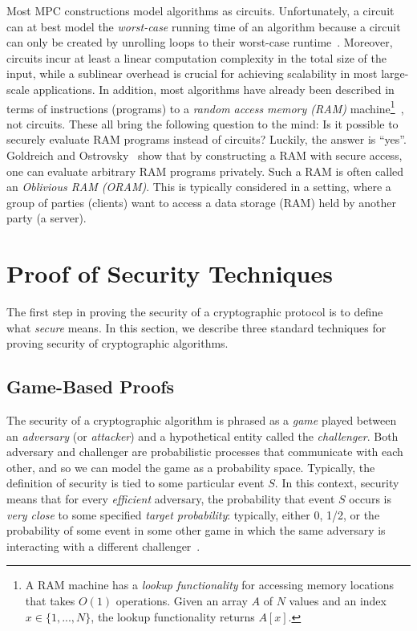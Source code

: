 \documentclass[11pt]{article}
\theoremstyle{plain}
\begin{document}
\label{sec:oram} Most MPC constructions model algorithms as circuits.
Unfortunately, a circuit can at best model the \emph{worst-case} running
time of an algorithm because a circuit can only be created by unrolling
loops to their worst-case runtime~\cite{Goldwasser:2013:Turing}.
Moreover, circuits incur at least a linear computation complexity
in the total size of the input, while a sublinear overhead is crucial
for achieving scalability in most large-scale applications. In addition,
most algorithms have already been described in terms of instructions
(programs) to a \emph{random access memory (RAM)} machine\footnote{A RAM machine has a \emph{lookup functionality} for accessing memory
	locations that takes $O(1)$ operations. Given an array $A$ of $N$
	values and an index $x\in\{1,...,N\}$, the lookup functionality returns
	$A[x]$.}~\cite{Cook:1972:TRA:800152.804898}, not circuits. These all bring
the following question to the mind: Is it possible to securely evaluate
RAM programs instead of circuits? Luckily, the answer is ``yes''.
Goldreich and Ostrovsky~\cite{Goldreich:1996:SPS:233551.233553}
show that by constructing a RAM with secure access, one can evaluate
arbitrary RAM programs privately. Such a RAM is often called an \emph{Oblivious
	RAM (ORAM)}. This is typically considered in a setting, where a group
of parties (clients) want to access a data storage (RAM) held by another
party (a server). 

\section{Proof of Security Techniques}

The first step in proving the security of a cryptographic protocol
is to define what \emph{secure} means. In this section, we describe
three standard techniques for proving security of cryptographic algorithms.

\subsection{Game-Based Proofs}

The security of a cryptographic algorithm is phrased as a \emph{game}
played between an \emph{adversary} (or \emph{attacker}) and a hypothetical
entity called the \emph{challenger}. Both adversary and challenger
are probabilistic processes that communicate with each other, and
so we can model the game as a probability space. Typically, the definition
of security is tied to some particular event $S$. In this context,
security means that for every \emph{efficient} adversary, the probability
that event $S$ occurs is \emph{very close} to some specified \emph{target
	probability}: typically, either 0, 1/2, or the probability of some
event in some other game in which the same adversary is interacting
with a different challenger~\cite{cryptoeprint:2004:332}.
\end{document}
